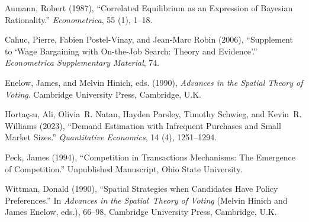\documentclass[ecta,nameyear,final,supplement]{econsocart}
\theoremstyle{plain}
\theoremstyle{definition}
\begin{document}



\begin{thebibliography}{}

Aumann, Robert (1987),
``Correlated Equilibrium as an Expression of Bayesian Rationality.''
\textit{Econometrica}, 55 (1), 1--18.
\endbibitem

Cahuc, Pierre, Fabien Postel-Vinay, and Jean-Marc Robin (2006), ``Supplement to `Wage Bargaining with On-the-Job Search: Theory and Evidence'.''
\textit{Econometrica Supplementary Material}, 74.
\endbibitem

Enelow, James, and Melvin Hinich, eds. (1990),
\textit{Advances in the Spatial Theory of Voting}.
Cambridge University Press, Cambridge, U.K. 
\endbibitem

Horta\c{c}su, Ali, Olivia~R. Natan, Hayden Parsley, Timothy Schwieg, and Kevin~R. Williams (2023),
``Demand Estimation with Infrequent Purchases and Small Market Sizes.''
\textit{Quantitative Economics}, 14 (4), 1251--1294.
\endbibitem


Peck, James (1994),
``Competition in Transactions Mechanisms: The Emergence of Competition.''
Unpublished Manuscript, Ohio State University.
\endbibitem


Wittman, Donald (1990),
``Spatial Strategies when Candidates Have Policy Preferences.''
In \textit{Advances in the Spatial~Theory of Voting}
(Melvin Hinich and James Enelow, eds.), 66--98,
Cambridge University Press, Cambridge, U.K.
\endbibitem


\end{thebibliography}
\end{document}
